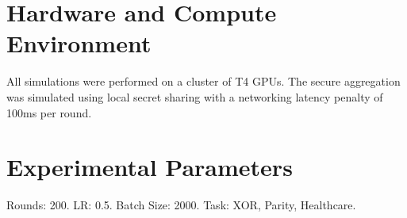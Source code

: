 \documentclass{article}
\theoremstyle{plain}
\theoremstyle{definition}
\begin{document}
\section{Hardware and Compute Environment}
All simulations were performed on a cluster of T4 GPUs. The secure aggregation was simulated using local secret sharing with a networking latency penalty of 100ms per round.

\section{Experimental Parameters}
Rounds: 200. LR: 0.5. Batch Size: 2000. Task: XOR, Parity, Healthcare.
\end{document}
